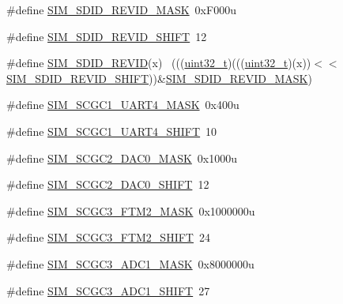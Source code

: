 \begin{DoxyCompactItemize}
\item 
\#define \hyperlink{group___s_i_m___register___masks_gafefd91d0385c1b93049ec14409ed6b1e}{S\+I\+M\+\_\+\+S\+D\+I\+D\+\_\+\+R\+E\+V\+I\+D\+\_\+\+M\+A\+SK}~0x\+F000u
\item 
\#define \hyperlink{group___s_i_m___register___masks_gadb535428e0ca83d2494493ed04822b8c}{S\+I\+M\+\_\+\+S\+D\+I\+D\+\_\+\+R\+E\+V\+I\+D\+\_\+\+S\+H\+I\+FT}~12
\item 
\#define \hyperlink{group___s_i_m___register___masks_ga892bb65b3dc043087208ead1ea269b95}{S\+I\+M\+\_\+\+S\+D\+I\+D\+\_\+\+R\+E\+V\+ID}(x)                                            ~(((\hyperlink{_p_e___types_8h_a33594304e786b158f3fb30289278f5af}{uint32\+\_\+t})(((\hyperlink{_p_e___types_8h_a33594304e786b158f3fb30289278f5af}{uint32\+\_\+t})(x))$<$$<$\hyperlink{group___s_i_m___register___masks_gadb535428e0ca83d2494493ed04822b8c}{S\+I\+M\+\_\+\+S\+D\+I\+D\+\_\+\+R\+E\+V\+I\+D\+\_\+\+S\+H\+I\+FT}))\&\hyperlink{group___s_i_m___register___masks_gafefd91d0385c1b93049ec14409ed6b1e}{S\+I\+M\+\_\+\+S\+D\+I\+D\+\_\+\+R\+E\+V\+I\+D\+\_\+\+M\+A\+SK})
\item 
\#define \hyperlink{group___s_i_m___register___masks_ga8f954b824205f507499799ba8262b366}{S\+I\+M\+\_\+\+S\+C\+G\+C1\+\_\+\+U\+A\+R\+T4\+\_\+\+M\+A\+SK}~0x400u
\item 
\#define \hyperlink{group___s_i_m___register___masks_ga0808f41650f2b3824b779bf4f2273f08}{S\+I\+M\+\_\+\+S\+C\+G\+C1\+\_\+\+U\+A\+R\+T4\+\_\+\+S\+H\+I\+FT}~10
\item 
\#define \hyperlink{group___s_i_m___register___masks_gaa2ff8b125be9c2ba5100d9764d43ad90}{S\+I\+M\+\_\+\+S\+C\+G\+C2\+\_\+\+D\+A\+C0\+\_\+\+M\+A\+SK}~0x1000u
\item 
\#define \hyperlink{group___s_i_m___register___masks_gaae3b27d52cfc735e1bdb66bff969acec}{S\+I\+M\+\_\+\+S\+C\+G\+C2\+\_\+\+D\+A\+C0\+\_\+\+S\+H\+I\+FT}~12
\item 
\#define \hyperlink{group___s_i_m___register___masks_gafe5009515ab0955d724fa5306171aeeb}{S\+I\+M\+\_\+\+S\+C\+G\+C3\+\_\+\+F\+T\+M2\+\_\+\+M\+A\+SK}~0x1000000u
\item 
\#define \hyperlink{group___s_i_m___register___masks_gaa31635b220d66ac1a6f8f59b3d64cc6e}{S\+I\+M\+\_\+\+S\+C\+G\+C3\+\_\+\+F\+T\+M2\+\_\+\+S\+H\+I\+FT}~24
\item 
\#define \hyperlink{group___s_i_m___register___masks_gaf26716d3c8b3d13168bbb2c879e69db1}{S\+I\+M\+\_\+\+S\+C\+G\+C3\+\_\+\+A\+D\+C1\+\_\+\+M\+A\+SK}~0x8000000u
\item 
\#define \hyperlink{group___s_i_m___register___masks_ga45dd1ca87c734edcbe3b47feee134746}{S\+I\+M\+\_\+\+S\+C\+G\+C3\+\_\+\+A\+D\+C1\+\_\+\+S\+H\+I\+FT}~27
$$
\end{DoxyCompactItemize}
